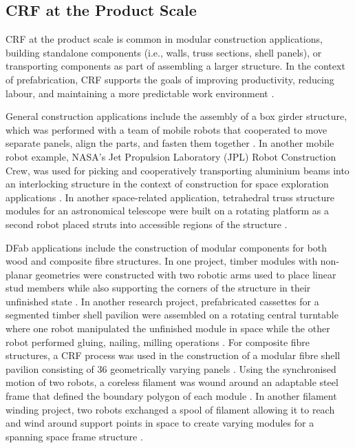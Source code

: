 \subsection{CRF at the Product Scale} \label{sec:2_product}
    CRF at the product scale is common in modular construction applications, building standalone components (i.e., walls, truss sections, shell panels), or transporting components as part of assembling a larger structure. In the context of prefabrication, CRF supports the goals of improving productivity, reducing labour, and maintaining a more predictable work environment \citep{vaha_extending_2013}.
    
    General construction applications include the assembly of a box girder structure, which was performed with a team of mobile robots that cooperated to move separate panels, align the parts, and fasten them together \citep{dogar_multi-scale_2015}. In another mobile robot example, NASA's Jet Propulsion Laboratory (JPL) Robot Construction Crew, was used for picking and cooperatively transporting aluminium beams into an interlocking structure in the context of construction for space exploration applications \citep{stroupe_behavior-based_2005,huntsberger_system_2005}. In another space-related application, tetrahedral truss structure modules for an astronomical telescope were built on a rotating platform as a second robot placed struts into accessible regions of the structure \citep{doggett_robotic_2002}.
    
    DFab applications include the construction of modular components for both wood and composite fibre structures. In one project, timber modules with non-planar geometries were constructed with two robotic arms used to place linear stud members while also supporting the corners of the structure in their unfinished state \citep{thoma_robotic_2018, adel_design_2018}. In another research project, prefabricated cassettes for a segmented timber shell pavilion were assembled on a rotating central turntable where one robot manipulated the unfinished module in space while the other robot performed gluing, nailing, milling operations \citep{wagner_flexible_2020}. For composite fibre structures, a CRF process was used in the construction of a modular fibre shell pavilion consisting of 36 geometrically varying panels \citep{doerstelmann_icditke_2015}. Using the synchronised motion of two robots, a coreless filament was wound around an adaptable steel frame that defined the boundary polygon of each module \citep{prado_core-less_2014, parascho_modular_2015}. In another filament winding project, two robots exchanged a spool of filament allowing it to reach and wind around support points in space to create varying modules for a spanning space frame structure \citep{duque_estrada_spatial_2020}.

